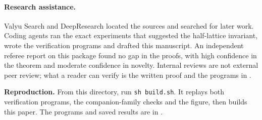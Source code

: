 \documentclass[11pt]{amsart}
\theoremstyle{definition}
\theoremstyle{remark}
\begin{document}
\paragraph{Research assistance.}
Valyu Search and DeepResearch located the sources and searched for later work. Coding agents ran the exact experiments that suggested the half-lattice invariant, wrote the verification programs and drafted this manuscript. An independent referee report on this package found no gap in the proofs, with high confidence in the theorem and moderate confidence in novelty. Internal reviews are not external peer review; what a reader can verify is the written proof and the programs in .

\smallskip
\noindent\textbf{Reproduction.} From this directory, run \texttt{sh build.sh}. It replays both verification programs, the companion-family checks and the figure, then builds this paper. The programs and saved results are in .



\end{document}
